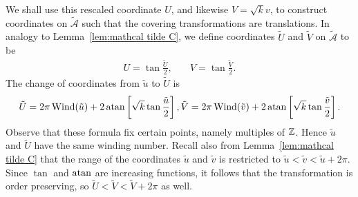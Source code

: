 \documentclass{article}
\begin{document}
We shall use this rescaled coordinate $U$, and likewise $V = \sqrt{k} v$, to construct coordinates on $\mathcal{\tilde{A}}$ such that the covering transformations are translations. 
In analogy to Lemma~\ref{lem:mathcal tilde C}, we define coordinates $\tilde{U}$ and $\tilde{V}$ on $\mathcal{\tilde{A}}$ to be
\begin{align*}
U = \tan \frac{\tilde{U}}{2},       &\quad
V = \tan \frac{\tilde{V}}{2}.       
\end{align*}
The change of coordinates from $\tilde{u}$ to $\tilde{U}$ is
\[
\tilde{U} = 2\pi\operatorname{Wind}(\tilde{u}) + 2 \operatorname{atan} \left[ \sqrt{k} \tan \frac{\tilde{u}}{2} \right],
\tilde{V} = 2\pi\operatorname{Wind}(\tilde{v}) + 2 \operatorname{atan} \left[ \sqrt{k} \tan \frac{\tilde{v}}{2} \right].
\]
Observe that these formula fix certain points, namely multiples of $\mathbb{Z}$.
Hence $\tilde{u}$ and $\tilde{U}$ have the same winding number.
Recall also from Lemma~\ref{lem:mathcal tilde C} that the range of the coordinates $\tilde{u}$ and $\tilde{v}$ is restricted to $\tilde{u} < \tilde{v} < \tilde{u} + 2\pi$.
Since $\tan$ and $\operatorname{atan}$ are increasing functions, it follows that the transformation is order preserving, so $\tilde{U} < \tilde{V} < \tilde{V} + 2\pi$ as well.

\end{document}
